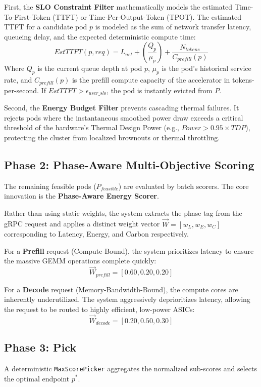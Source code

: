 \documentclass[12pt,a4paper,oneside]{report}
\begin{document}
First, the \textbf{SLO Constraint Filter} mathematically models the estimated Time-To-First-Token (TTFT) or Time-Per-Output-Token (TPOT). The estimated TTFT for a candidate pod $p$ is modeled as the sum of network transfer latency, queueing delay, and the expected deterministic compute time:
\begin{equation}
EstTTFT(p, req) = L_{net} + \left( \frac{Q_p}{\mu_p} \right) + \frac{N_{tokens}}{C_{prefill}(p)}
\end{equation}
Where $Q_p$ is the current queue depth at pod $p$, $\mu_p$ is the pod's historical service rate, and $C_{prefill}(p)$ is the prefill compute capacity of the accelerator in tokens-per-second. If $EstTTFT > \epsilon_{user\_slo}$, the pod is instantly evicted from $P$.

Second, the \textbf{Energy Budget Filter} prevents cascading thermal failures. It rejects pods where the instantaneous smoothed power draw exceeds a critical threshold of the hardware's Thermal Design Power (e.g., $Power > 0.95 \times TDP$), protecting the cluster from localized brownouts or thermal throttling.

\subsection{Phase 2: Phase-Aware Multi-Objective Scoring}
The remaining feasible pods ($P_{feasible}$) are evaluated by batch scorers. The core innovation is the \textbf{Phase-Aware Energy Scorer}.

Rather than using static weights, the system extracts the phase tag from the gRPC request and applies a distinct weight vector $\vec{W} = [w_L, w_E, w_C]$ corresponding to Latency, Energy, and Carbon respectively.

For a \textbf{Prefill} request (Compute-Bound), the system prioritizes latency to ensure the massive GEMM operations complete quickly:
\[ \vec{W}_{prefill} = [0.60, 0.20, 0.20] \]

For a \textbf{Decode} request (Memory-Bandwidth-Bound), the compute cores are inherently underutilized. The system aggressively deprioritizes latency, allowing the request to be routed to highly efficient, low-power ASICs:
\[ \vec{W}_{decode} = [0.20, 0.50, 0.30] \]

\subsection{Phase 3: Pick}
A deterministic \texttt{MaxScorePicker} aggregates the normalized sub-scores and selects the optimal endpoint $p^*$.
\end{document}
